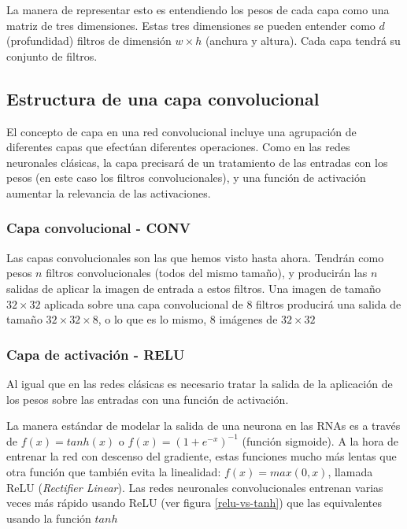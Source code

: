 La manera de representar esto es entendiendo los pesos de cada capa como una matriz de tres dimensiones. Estas tres dimensiones se pueden entender como $d$ (profundidad) filtros de dimensión  $w \times h$ (anchura y altura). Cada capa tendrá su conjunto de filtros.

\subsection{Estructura de una capa convolucional}

El concepto de capa en una red convolucional incluye una agrupación de diferentes capas que efectúan diferentes operaciones. Como en las redes neuronales clásicas, la capa precisará de un tratamiento de las entradas con los pesos (en este caso los filtros convolucionales), y una función de activación aumentar la relevancia de las activaciones. 

\subsubsection{Capa convolucional - CONV}

Las capas convolucionales son las que hemos visto hasta ahora. Tendrán como pesos $n$ filtros convolucionales (todos del mismo tamaño), y producirán las $n$ salidas de aplicar la imagen de entrada a estos filtros. Una imagen de tamaño $32\times 32$ aplicada sobre una capa convolucional de 8 filtros producirá una salida de tamaño $32 \times 32 \times 8$, o lo que es lo mismo, 8 imágenes de $32 \times 32$

\subsubsection{Capa de activación - RELU}

Al igual que en las redes clásicas es necesario tratar la salida de la aplicación de los pesos sobre las entradas con una función de activación. 

La manera estándar de modelar la salida de una neurona en las RNAs es a través de $f(x) = tanh(x)$ o $f(x) = (1 + e^{-x})^{-1}$ (función sigmoide). A la hora de entrenar la red con descenso del gradiente, estas funciones mucho más lentas que otra función que también evita la linealidad: $f(x) = max(0, x)$, llamada ReLU (\textit{Rectifier Linear}). Las redes neuronales convolucionales entrenan varias veces más rápido usando ReLU (ver figura \ref{relu-vs-tanh}) que las equivalentes usando la función $tanh$ \parencite{krizhevsky2012imagenet}

